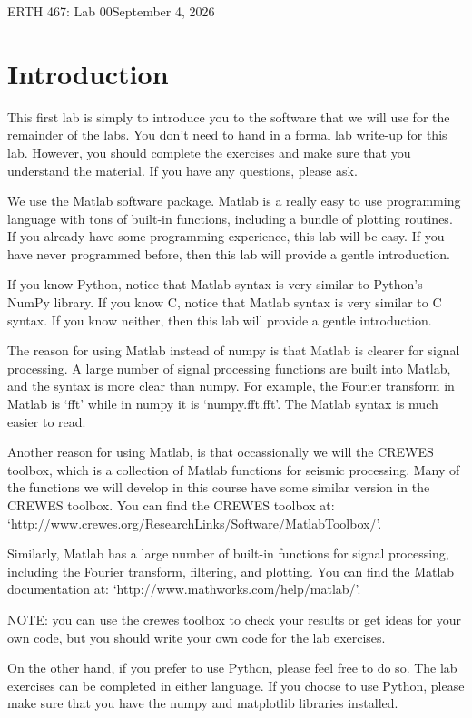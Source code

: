\documentclass[letter]{article}
\begin{document}
\large{ERTH 467: Lab 00}\hfill \large{September 4, 2026}\\

\section*{Introduction}
This first lab is simply to introduce you to the software that we will
use for the remainder of the labs. You don't need to hand in a formal lab write-up for this lab.  However, you should complete the exercises and make sure that you understand the
material.  If you have any questions, please ask.  

We use the Matlab software package.  Matlab is a really easy to use programming language with
tons of built-in functions, including a bundle of plotting
routines. If you already have some programming experience, this lab
will be easy.  If you have never programmed before, then this lab will
provide a gentle introduction.

If you know Python, notice that Matlab syntax is very similar to Python's NumPy library.  
If you know C, notice that Matlab syntax is very similar to C syntax.
If you know neither, then this lab will provide a gentle introduction.

The reason for using Matlab instead of numpy is that Matlab is clearer for signal processing.
A large number of signal processing functions are built into Matlab, and the syntax is more clear than numpy.  
For example, the Fourier transform in Matlab is `fft' while in numpy it is `numpy.fft.fft'.  
The Matlab syntax is much easier to read.

Another reason for using Matlab, is that occassionally we will the CREWES toolbox, 
which is a collection of Matlab functions for seismic processing. 
Many of the functions we will develop in this course have some similar version in the CREWES toolbox.
You can find the CREWES toolbox at: `http://www.crewes.org/ResearchLinks/Software/MatlabToolbox/'.

Similarly, Matlab has a large number of built-in functions for signal processing,
including the Fourier transform, filtering, and plotting.  You can find the Matlab documentation at:
`http://www.mathworks.com/help/matlab/'.

NOTE: you can use the crewes toolbox to check your results or get ideas for your own code, 
but you should write your own code for the lab exercises.

On the other hand, if you prefer to use Python, please feel free to do so.  
The lab exercises can be completed in either language.  
If you choose to use Python, please make sure that you have the numpy and matplotlib libraries installed.
\end{document}
